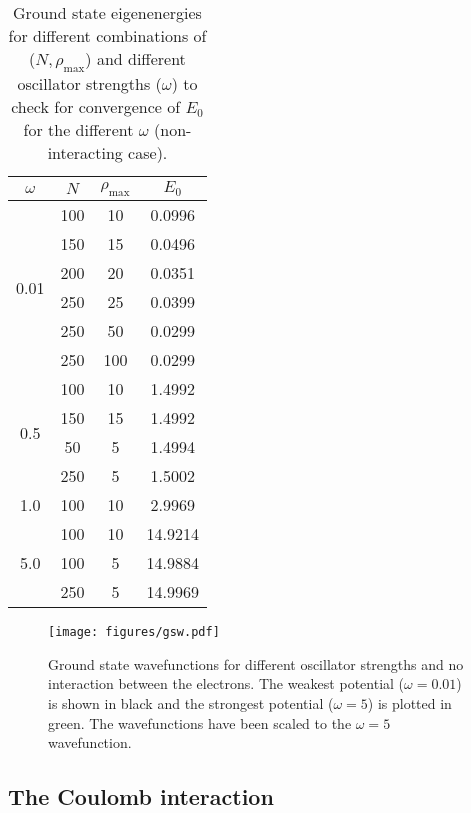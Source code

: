 \documentclass[10pt,showpacs,preprintnumbers,footinbib,amsmath,amssymb,aps,prl,twocolumn,groupedaddress,superscriptaddress,showkeys]{revtex4-1}
\newcommand{\rhomax}{
	\ensuremath{ \rho _{\mathrm{max}}} }
\begin{document}
{\begin{table}
\centering
	\begin{tabular}{ c | c c c }
	$\omega$ & $N$ & \rhomax & $E_0$\\
\hline
	\multirow{6}{*}{0.01} & 100 & 10 & 0.0996\\
	        & 150 & 15 & 0.0496\\
	        & 200 & 20 & 0.0351\\
	        & 250 & 25 & 0.0399\\
	        & 250 & 50 & 0.0299\\
	        & 250 & 100&0.0299\\
\hline
	\multirow{4}{*}{0.5} & 100 & 10 & 1.4992\\
				     & 150 & 15 & 1.4992\\
				     &  50  & 5   & 1.4994\\
				     & 250 & 5   & 1.5002\\
\hline
	1.0 & 100 & 10 & 2.9969\\
\hline
	\multirow{3}{*}{5.0} & 100 & 10 & 14.9214\\
	      & 100 & 5   & 14.9884\\
	      & 250 & 5   & 14.9969
	\end{tabular}
	\caption{Ground state eigenenergies for different combinations of
	($N,\rhomax$) and different oscillator strengths ($\omega$) to check
	for convergence of $E_0$ for the different $\omega$ (non-interacting case).}
	\label{tab:w}
\end{table}

\begin{figure}
\centering
	\texttt{[image: figures/gsw.pdf]}
	\caption{Ground state wavefunctions for different oscillator
	strengths and no interaction between the electrons.
	The weakest potential ($\omega = 0.01$) is shown in black and the
	strongest potential ($\omega = 5$) is plotted in green.
	The wavefunctions have been scaled to the $\omega = 5$ wavefunction.}
	\label{fig:gsw}
\end{figure}


\subsection{The Coulomb interaction}

}
\end{document}
